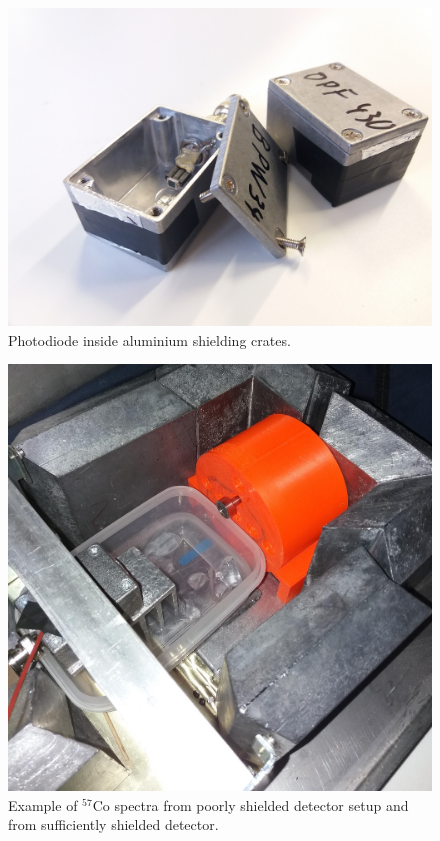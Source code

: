 \begin{figure}[H]
 \centering
 \includegraphics[scale=0.09, angle = 0]{./pictures/ShieldCrate.jpg}
 \caption{Photodiode inside aluminium shielding crates.}
 \label{crate}
 
\end{figure}


\begin{figure}[H]
 \centering
 \includegraphics[scale=0.09, angle = 0]{./pictures/chlazeniLedem.jpg}
 \caption{Example of $^{57}$Co spectra from poorly shielded detector setup and from sufficiently shielded detector.}
 \label{notShielded}
 
\end{figure}





